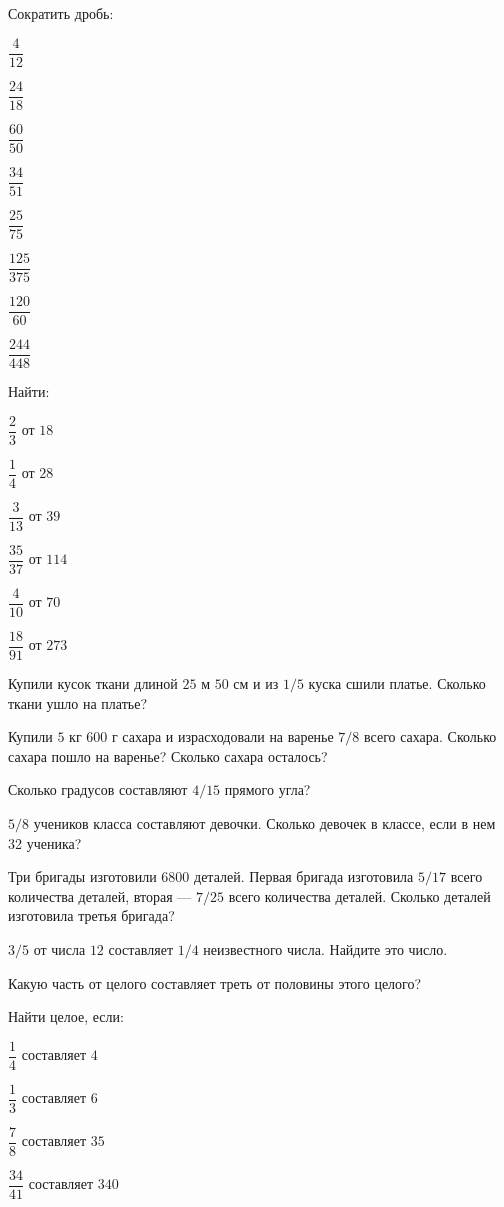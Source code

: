 \begin{listofex}
	\item Сократить дробь:
	\begin{enumcols}[itemcolumns=4]
		\item \( \dfrac{4}{12} \)
		\item \( \dfrac{24}{18} \)
		\item \( \dfrac{60}{50} \)
		\item \( \dfrac{34}{51} \)
		\item \( \dfrac{25}{75} \)
		\item \( \dfrac{125}{375} \)
		\item \( \dfrac{120}{60} \)
		\item \( \dfrac{244}{448} \)
	\end{enumcols}
	\item Найти:
	\begin{enumcols}[itemcolumns=3]
		\item \( \dfrac{2}{3} \) от \( 18 \)
		\item \( \dfrac{1}{4} \) от \( 28 \)
		\item \( \dfrac{3}{13} \) от \( 39 \)
		\item \( \dfrac{35}{37} \) от \( 114 \)
		\item \( \dfrac{4}{10} \) от \( 70 \)
		\item \( \dfrac{18}{91} \) от \( 273 \)
	\end{enumcols}
	\item Купили кусок ткани длиной \( 25 \) м \( 50 \) см и из \( 1/5 \) куска сшили платье. Сколько ткани ушло на платье?
	\item Купили \( 5 \) кг \( 600 \) г сахара и израсходовали на варенье \( 7/8 \) всего сахара. Сколько сахара пошло на варенье? Сколько сахара осталось?
	\item Сколько градусов составляют \( 4/15 \) прямого угла?
	\item \( 5/8 \) учеников класса составляют девочки. Сколько девочек в классе, если в нем 32
	ученика?
	\item Три бригады изготовили 6800 деталей. Первая бригада изготовила  \( 5/17 \) всего количества деталей, вторая --- \( 7/25 \) всего количества деталей. Сколько деталей изготовила третья бригада?
	\item \( 3/5 \) от числа \( 12 \) составляет \( 1/4 \) неизвестного числа. Найдите это число.
	\item Какую часть от целого составляет треть от половины этого целого?
	\item Найти целое, если:
	\begin{enumcols}[itemcolumns=4]
		\item \( \dfrac{1}{4} \) составляет \( 4 \)
		\item \( \dfrac{1}{3} \) составляет \( 6 \)
		\item \( \dfrac{7}{8} \) составляет \( 35 \)
		\item \( \dfrac{34}{41} \) составляет \( 340 \)
	\end{enumcols}
\end{listofex}
